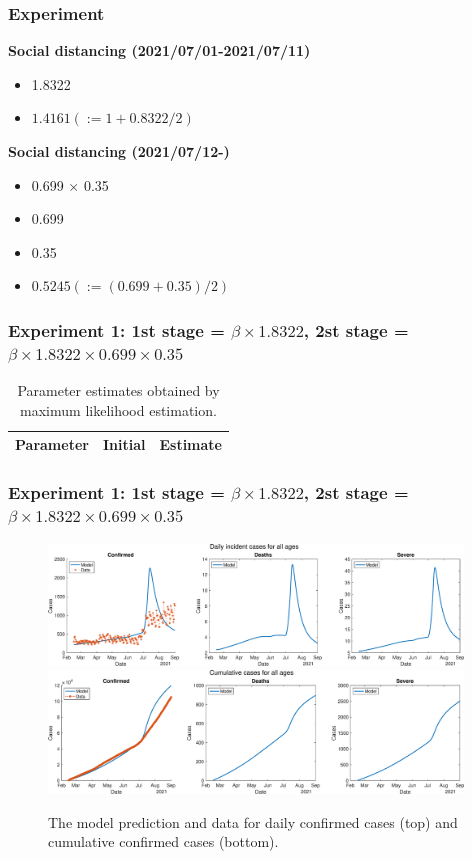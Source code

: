 \documentclass[aspectratio=169, 9pt, xcolor=dvipsnames]{beamer}
\begin{document}
	\begin{frame}\frametitle{Experiment}
		\textbf{Social distancing (2021/07/01-2021/07/11)}
	    \begin{itemize}
	    	\item 1.8322
	    	\item $1.4161 (:=1+0.8322/2)$
	    \end{itemize}
	    \vspace{0.5cm}
	    \textbf{Social distancing (2021/07/12-)}
	    \begin{itemize}
	    	\item 0.699 $\times$ 0.35
	    	\item 0.699
	    	\item 0.35
	    	\item $0.5245 (:= (0.699+0.35)/2)$
	    \end{itemize}
	\end{frame}

	\begin{frame}\frametitle{Experiment 1: 1st stage = $\beta \times 1.8322$, 2st stage = $\beta \times 1.8322 \times 0.699 \times 0.35$}
	    \begin{table}
	    	\begin{tabular}{crr}
	    		\toprule
	    		\textbf{Parameter} & \textbf{Initial} & \textbf{Estimate} \\
	    		\midrule
	    		
	    		\bottomrule
	    	\end{tabular}
	    	\caption{Parameter estimates obtained by maximum likelihood estimation.}
	    \end{table}
	\end{frame}

	\begin{frame}\frametitle{Experiment 1: 1st stage = $\beta \times 1.8322$, 2st stage = $\beta \times 1.8322 \times 0.699 \times 0.35$}
	    \begin{figure}
	    	\centering
	    	\includegraphics[width=11cm]{../results/estimate_sd_1st_1_2nd_1/daily_all_age.eps}
	    	\includegraphics[width=11cm]{../results/estimate_sd_1st_1_2nd_1/cumul_all_age.eps}
	    	\caption{The model prediction and data for daily confirmed cases (top) and cumulative confirmed cases (bottom).}
	    \end{figure}
	\end{frame}
\end{document}
